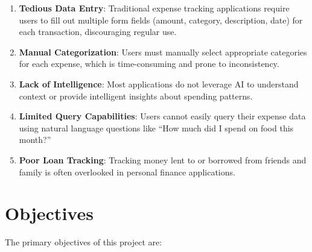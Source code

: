 \begin{enumerate}
    \item \textbf{Tedious Data Entry}: Traditional expense tracking applications require users to fill out multiple form fields (amount, category, description, date) for each transaction, discouraging regular use.
    
    \item \textbf{Manual Categorization}: Users must manually select appropriate categories for each expense, which is time-consuming and prone to inconsistency.
    
    \item \textbf{Lack of Intelligence}: Most applications do not leverage AI to understand context or provide intelligent insights about spending patterns.
    
    \item \textbf{Limited Query Capabilities}: Users cannot easily query their expense data using natural language questions like ``How much did I spend on food this month?''
    
    \item \textbf{Poor Loan Tracking}: Tracking money lent to or borrowed from friends and family is often overlooked in personal finance applications.
\end{enumerate}

\section{Objectives}

The primary objectives of this project are:

